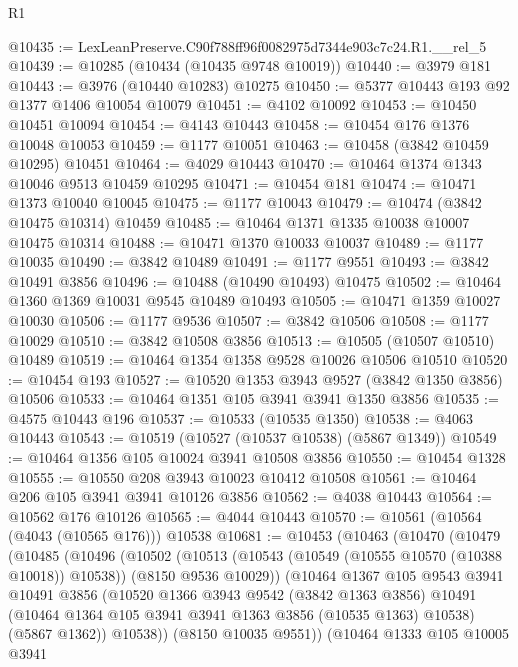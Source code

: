 \begin{lexlean}{R1}
\begin{coremodule}
@10435 := LexLeanPreserve.C90f788ff96f0082975d7344e903c7c24.R1.__rel_5
@10439 := @10285 (@10434 (@10435 @9748 @10019))
@10440 := @3979 @181
@10443 := @3976 (@10440 @10283) @10275
@10450 := @5377 @10443 @193 @92 @1377 @1406 @10054 @10079
@10451 := @4102 @10092
@10453 := @10450 @10451 @10094
@10454 := @4143 @10443
@10458 := @10454 @176 @1376 @10048 @10053
@10459 := @1177 @10051
@10463 := @10458 (@3842 @10459 @10295) @10451
@10464 := @4029 @10443
@10470 := @10464 @1374 @1343 @10046 @9513 @10459 @10295
@10471 := @10454 @181
@10474 := @10471 @1373 @10040 @10045
@10475 := @1177 @10043
@10479 := @10474 (@3842 @10475 @10314) @10459
@10485 := @10464 @1371 @1335 @10038 @10007 @10475 @10314
@10488 := @10471 @1370 @10033 @10037
@10489 := @1177 @10035
@10490 := @3842 @10489
@10491 := @1177 @9551
@10493 := @3842 @10491 @3856
@10496 := @10488 (@10490 @10493) @10475
@10502 := @10464 @1360 @1369 @10031 @9545 @10489 @10493
@10505 := @10471 @1359 @10027 @10030
@10506 := @1177 @9536
@10507 := @3842 @10506
@10508 := @1177 @10029
@10510 := @3842 @10508 @3856
@10513 := @10505 (@10507 @10510) @10489
@10519 := @10464 @1354 @1358 @9528 @10026 @10506 @10510
@10520 := @10454 @193
@10527 := @10520 @1353 @3943 @9527 (@3842 @1350 @3856) @10506
@10533 := @10464 @1351 @105 @3941 @3941 @1350 @3856
@10535 := @4575 @10443 @196
@10537 := @10533 (@10535 @1350)
@10538 := @4063 @10443
@10543 := @10519 (@10527 (@10537 @10538) (@5867 @1349))
@10549 := @10464 @1356 @105 @10024 @3941 @10508 @3856
@10550 := @10454 @1328
@10555 := @10550 @208 @3943 @10023 @10412 @10508
@10561 := @10464 @206 @105 @3941 @3941 @10126 @3856
@10562 := @4038 @10443
@10564 := @10562 @176 @10126
@10565 := @4044 @10443
@10570 := @10561 (@10564 (@4043 (@10565 @176))) @10538
@10681 := @10453
    (@10463
      (@10470
        (@10479
          (@10485
            (@10496
              (@10502
                (@10513
                  (@10543 (@10549 (@10555 @10570 (@10388 @10018)) @10538))
                  (@8150 @9536 @10029))
                (@10464
                  @1367
                  @105
                  @9543
                  @3941
                  @10491
                  @3856
                  (@10520
                    @1366
                    @3943
                    @9542
                    (@3842 @1363 @3856)
                    @10491
                    (@10464 @1364 @105 @3941 @3941 @1363 @3856 (@10535 @1363) @10538)
                    (@5867 @1362))
                  @10538))
              (@8150 @10035 @9551))
            (@10464
              @1333
              @105
              @10005
              @3941

\end{coremodule}
\end{lexlean}
